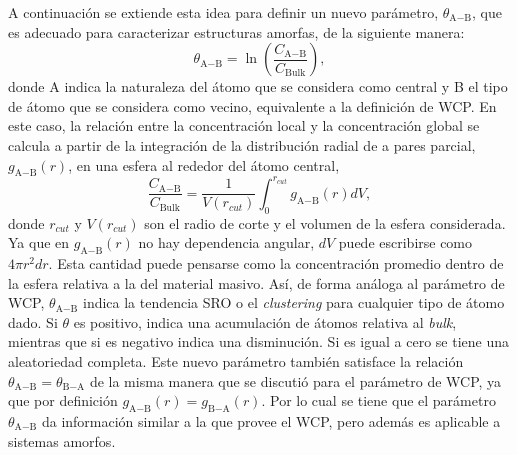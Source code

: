A continuación se extiende esta idea para definir un nuevo parámetro, 
$\theta_{\text{A}-\text{B}}$, que es adecuado para caracterizar estructuras amorfas, de la 
siguiente manera:
\begin{equation}
    \theta_{\text{A}-\text{B}} = \ln \left( \frac{C_{\text{A}-\text{B}}}{C_{\text{Bulk}}} \right),
\end{equation}
donde A indica la naturaleza del átomo que se considera como central y B el tipo
de átomo que se considera como vecino, equivalente a la definición de WCP. En
este caso, la relación entre la concentración local y la concentración global se 
calcula a partir de la integración de la distribución radial de a pares parcial,
$g_{\text{A}-\text{B}}(r)$, en una esfera al rededor del átomo central,
\begin{equation}
    \frac{C_{\text{A}-\text{B}}}{C_{\text{Bulk}}} = \frac{1}{V(r_{cut})} \int_0^{r_{cut}} g_{\text{A}-\text{B}}(r) dV,
\end{equation}
donde $r_{cut}$ y $V(r_{cut})$ son el radio de corte y el volumen de la esfera 
considerada. Ya que en $g_{\text{A}-\text{B}}(r)$ no hay dependencia angular, $dV$ puede 
escribirse como $4 \pi r^2 dr$. Esta cantidad puede pensarse como la 
concentración promedio dentro de la esfera relativa a la del material 
masivo. Así, de forma análoga al parámetro de WCP, $\theta_{\text{A}-\text{B}}$ indica 
la tendencia SRO o el \textit{clustering} para cualquier tipo de átomo dado.
Si $\theta$ es positivo, indica una acumulación de átomos relativa al 
\textit{bulk}, mientras que si es negativo indica una disminución. Si es igual a 
cero se tiene una aleatoriedad completa. Este nuevo parámetro también satisface 
la relación $\theta_{\text{A}-\text{B}} = \theta_{\text{B}-\text{A}}$ de la misma manera que se discutió para
el parámetro de WCP, ya que por definición $g_{\text{A}-\text{B}}(r) = g_{\text{B}-\text{A}}(r)$. Por lo cual 
se tiene que el parámetro $\theta_{\text{A}-\text{B}}$ da información similar a la que provee 
el WCP, pero además es aplicable a sistemas amorfos.

